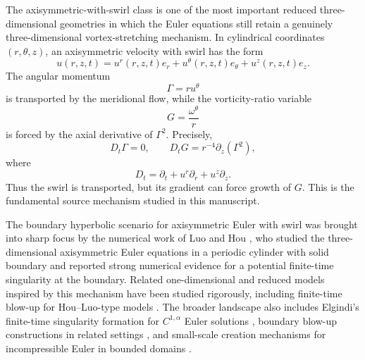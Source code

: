 \documentclass[11pt]{amsart}
\begin{document}
The axisymmetric-with-swirl class is one of the most important reduced three-dimensional geometries in which the Euler equations still retain a genuinely three-dimensional vortex-stretching mechanism.  In cylindrical coordinates \((r,\theta,z)\), an axisymmetric velocity with swirl has the form
\begin{equation}\label{eq:axisym_velocity}
u(r,z,t)=u^r(r,z,t)e_r+u^\theta(r,z,t)e_\theta+u^z(r,z,t)e_z.
\end{equation}
The angular momentum
\begin{equation}\label{eq:Gamma_def}
\Gamma=r u^\theta
\end{equation}
is transported by the meridional flow, while the vorticity-ratio variable
\begin{equation}\label{eq:G_def}
G=\frac{\omega^\theta}{r}
\end{equation}
is forced by the axial derivative of \(\Gamma^2\).  Precisely,
\begin{equation}\label{eq:Gamma_G_equations_intro}
D_t\Gamma=0,
\qquad
D_tG=r^{-4}\partial_z(\Gamma^2),
\end{equation}
where
\[
D_t=\partial_t+u^r\partial_r+u^z\partial_z.
\]
Thus the swirl is transported, but its gradient can force growth of \(G\).  This is the fundamental source mechanism studied in this manuscript.

The boundary hyperbolic scenario for axisymmetric Euler with swirl was brought into sharp focus by the numerical work of Luo and Hou \cite{LuoHouPNAS2014,LuoHouMMS2014}, who studied the three-dimensional axisymmetric Euler equations in a periodic cylinder with solid boundary and reported strong numerical evidence for a potential finite-time singularity at the boundary.  Related one-dimensional and reduced models inspired by this mechanism have been studied rigorously, including finite-time blow-up for Hou--Luo-type models \cite{ChoiHouKiselevLuoSverakYao2017,ChenHouHuang2022}.  The broader landscape also includes Elgindi's finite-time singularity formation for \(C^{1,\alpha}\) Euler solutions \cite{Elgindi2021}, boundary blow-up constructions in related settings \cite{ChenHou2021}, and small-scale creation mechanisms for incompressible Euler in bounded domains \cite{KiselevSverak2014}.
\end{document}
